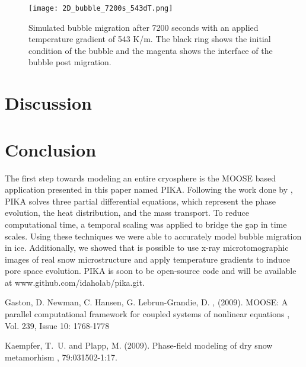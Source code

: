 \documentclass[twoside]{article}
\begin{document}
\begin{multicols}{2}
\begin{figure}[H] 
  \centering
    \texttt{[image: 2D\_bubble\_7200s\_543dT.png]}
  \caption{Simulated bubble migration after 7200 seconds with an applied temperature gradient of 543 K/m. The black ring shows the initial condition of the bubble and the magenta shows the interface of the bubble post migration.}
\label{fig:bubble}
\end{figure}




\section{Discussion}

\section{Conclusion}
The first step towards modeling an entire cryosphere is the MOOSE based application presented in this paper named PIKA. Following the work done by \cite{Plapp_2009}, PIKA solves three partial differential equations, which represent the phase evolution, the heat distribution, and the mass transport. To reduce computational time, a temporal scaling was applied to bridge the gap in time scales. Using these techniques we were able to accurately model bubble migration in ice. Additionally, we showed that is possible to use x-ray microtomographic images of real snow microstructure and apply temperature gradients to induce pore space evolution. PIKA is soon to be open-source code and will be available at www.github.com/idaholab/pika.git.    

\begin{thebibliography}{50} %


Gaston, D.  Newman, C. Hansen, G. Lebrun-Grandie, D. , (2009).
\newblock MOOSE: A parallel computational framework for coupled systems of nonlinear equations
, Vol. 239, Issue 10: 1768-1778 

Kaempfer, T.~U. and Plapp, M. (2009).
\newblock Phase-field modeling of dry snow metamorhism
, 79:031502-1:17.

\end{thebibliography}


\end{multicols}
\end{document}
